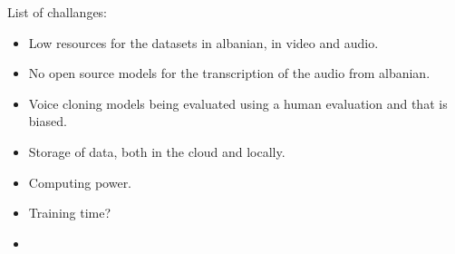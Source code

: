 \documentclass[12pt]{article}
\begin{document}
List of challanges:
\begin{itemize}
    \item Low resources for the datasets in albanian, in video and audio.
    \item No open source models for the transcription of the audio from albanian.
    \item Voice cloning models being evaluated using a human evaluation and that is biased.
    \item Storage of data, both in the cloud and locally.
    \item Computing power.
    \item Training time?
    \item 
\end{itemize}




\end{document}
